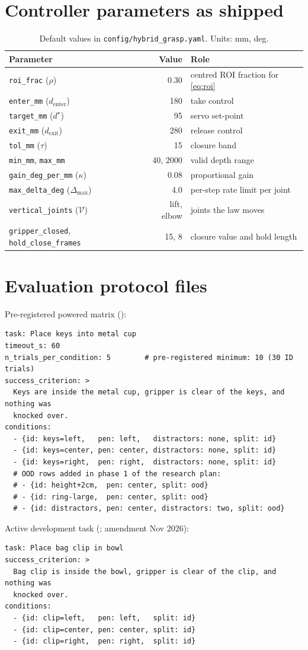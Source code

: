\documentclass[11pt,a4paper]{article}
\theoremstyle{definition}
\begin{document}
\section{Controller parameters as shipped}
\begin{table}[h]
\centering\small
\caption{Default values in \texttt{config/hybrid\_grasp.yaml}. Units: mm, deg.}
\begin{tabular}{@{}lrl@{}}
\toprule
Parameter & Value & Role \\
\midrule
\texttt{roi\_frac} ($\rho$) & 0.30 & centred ROI fraction for \cref{eq:roi} \\
\texttt{enter\_mm} ($d_{\mathrm{enter}}$) & 180 & take control \\
\texttt{target\_mm} ($d^\star$) & 95 & servo set-point \\
\texttt{exit\_mm} ($d_{\mathrm{exit}}$) & 280 & release control \\
\texttt{tol\_mm} ($\tau$) & 15 & closure band \\
\texttt{min\_mm}, \texttt{max\_mm} & 40, 2000 & valid depth range \\
\texttt{gain\_deg\_per\_mm} ($\kappa$) & 0.08 & proportional gain \\
\texttt{max\_delta\_deg} ($\Delta_{\max}$) & 4.0 & per-step rate limit per joint \\
\texttt{vertical\_joints} ($\mathcal{V}$) & lift, elbow & joints the law moves \\
\texttt{gripper\_closed}, \texttt{hold\_close\_frames} & 15, 8 & closure value and hold length \\
\bottomrule
\end{tabular}
\end{table}

\section{Evaluation protocol files}
Pre-registered powered matrix ():
\begin{verbatim}
task: Place keys into metal cup
timeout_s: 60
n_trials_per_condition: 5        # pre-registered minimum: 10 (30 ID trials)
success_criterion: >
  Keys are inside the metal cup, gripper is clear of the keys, and nothing was
  knocked over.
conditions:
  - {id: keys=left,   pen: left,   distractors: none, split: id}
  - {id: keys=center, pen: center, distractors: none, split: id}
  - {id: keys=right,  pen: right,  distractors: none, split: id}
  # OOD rows added in phase 1 of the research plan:
  # - {id: height+2cm,  pen: center, split: ood}
  # - {id: ring-large,  pen: center, split: ood}
  # - {id: distractors, pen: center, distractors: two, split: ood}
\end{verbatim}
Active development task (; amendment Nov 2026):
\begin{verbatim}
task: Place bag clip in bowl
success_criterion: >
  Bag clip is inside the bowl, gripper is clear of the clip, and nothing was
  knocked over.
conditions:
  - {id: clip=left,   pen: left,   split: id}
  - {id: clip=center, pen: center, split: id}
  - {id: clip=right,  pen: right,  split: id}
\end{verbatim}
\end{document}
